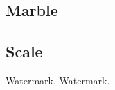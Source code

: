 \documentclass[12pt,a4paper]{article}
\begin{document}
\begin{singlespace}
\clearpage
\renewcommand{\mat}{Marble}
\subsection{\mat}

\renewcommand{\Number}{01}\InputImage{\sfl}{\tsm}{\sexdi}{\tsm}{\sexdi}{\tsm}
{}{}
\renewcommand{\Number}{02}\InputImage{\sfl}{\tsm}{\sexdi}{\tsm}{\sexdi}{\tsm}
{}{}
\renewcommand{\Number}{03}\InputImage{\sfl}{\tco}{\sfl}{\tco}{\sexdi}{\tco}
{}{}
\renewcommand{\Number}{04}\InputImage{\sfl}{\tco}{\sexdi}{\tco}{\sexdi}{\tco}
{}{}
\renewcommand{\Number}{05}\InputImage{\sfl}{\tsm}{\sexdi}{\tco}{\sexdi}{\tco}
{}{}
\renewcommand{\Number}{06}\InputImage{\sexdi}{\tco}{\sexdi}{\tco}{\sexdi}{\tco}
{}{}
\renewcommand{\Number}{07}\InputImage{\sexdi}{\tco}{\sexdi}{\tco}{\sexdi}{\tco}
{}{}
\renewcommand{\Number}{08}\InputImage{\sexdi}{\tsm}{\sexdi}{\tsm}{\sexdi}{\tsm}
{}{}
\renewcommand{\Number}{09}\InputImage{\sro}{\tsm}{\sro}{\tsm}{\sro}{\tsm}
{}{}
\renewcommand{\Number}{10}\InputImage{\sfl}{\tsm}{\sexdi}{\tsm}{\sro}{\tsm}
{}{}
\renewcommand{\Number}{11}\InputImage{\sro}{\tco}{\sro}{\tco}{\sro}{\tco}
{}{}
\renewcommand{\Number}{12}\InputImage{\sfl}{\tsm}{\sexdi}{\tsm}{\sexdi}{\tsm}
{}{}

\clearpage
\renewcommand{\mat}{Scale}
\subsection{\mat}

\renewcommand{\Number}{01}\InputImage{\sfl}{\tsm}{\sro}{\tbu}{\sro}{\tbu}
{}{}
\renewcommand{\Number}{02}\InputImage{\sfl}{\tco}{\sro}{\tbu}{\sro}{\tbu}
{}{}
\renewcommand{\Number}{03}\InputImage{\sfl}{\tsm}{\sro}{\tbu}{\sro}{\tbu}
{}{}
\renewcommand{\Number}{04}\InputImage{\sfl}{\tsm}{\sro}{\tbu}{\sro}{\tbu}
{}{}
\renewcommand{\Number}{05}\InputImage{\sfl}{\tsm}{\sro}{\tbu}{\sro}{\tbu}
{}{}
\renewcommand{\Number}{06}\InputImage{\sfl}{\tsm}{\sro}{\tbu}{\sro}{\tbu}
{Watermark.}{}
\renewcommand{\Number}{07}\InputImage{\sfl}{\tsm}{\sro}{\tbu}{\sro}{\tbu}
{Watermark.}{}
\renewcommand{\Number}{08}\InputImage{\sfl}{\tsm}{\sro}{\tbu}{\sro}{\tbu}
{}{}
\renewcommand{\Number}{09}\InputImage{\sfl}{\tsm}{\sro}{\tbu}{\sro}{\tbu}
{}{}
\renewcommand{\Number}{10}\InputImage{\sfl}{\tsm}{\sro}{\tbu}{\sro}{\tbu}
{}{}
\renewcommand{\Number}{11}\InputImage{\sfl}{\tsm}{\sro}{\tbu}{\sro}{\tbu}
{}{}
\renewcommand{\Number}{12}\InputImage{\sfl}{\tsm}{\sro}{\tbu}{\sro}{\tbu}
{}{}

\clearpage
\renewcommand{\mat}{Silk}

\end{singlespace}
\end{document}
